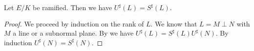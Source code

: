 %
\begin{theorem}\label{ker:ramif}
 Let $E/K$ be ramified. Then we have $U^\sharp(L) = S^\sharp(L)$.
\end{theorem}
\begin{proof}
We proceed by induction on the rank of $L$. We know that
$L = M \perp N$ with $M$ a line or a subnormal plane. By  we have $U^\sharp(L) = S^\sharp(L)U^\sharp(N)$. By induction $U^\sharp(N)=S^\sharp(N)$.
\end{proof}

